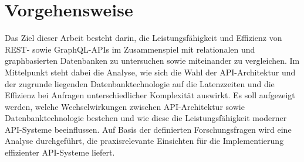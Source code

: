 \section{Vorgehensweise} %
\label{sec:vorgehensweise}
Das Ziel dieser Arbeit besteht darin, die Leistungsfähigkeit und Effizienz von REST- sowie GraphQL-APIs im Zusammenspiel mit relationalen und graphbasierten Datenbanken zu untersuchen sowie miteinander zu vergleichen. Im Mittelpunkt steht dabei die Analyse, wie sich die Wahl der API-Architektur und der zugrunde liegenden Datenbanktechnologie auf die Latenzzeiten und die Effizienz bei Anfragen unterschiedlicher Komplexität auswirkt. Es soll aufgezeigt werden, welche Wechselwirkungen zwischen API-Architektur sowie Datenbanktechnologie bestehen und wie diese die Leistungsfähigkeit moderner API-Systeme beeinflussen. Auf Basis der definierten Forschungsfragen wird eine Analyse durchgeführt, die praxisrelevante Einsichten für die Implementierung effizienter API-Systeme liefert.

